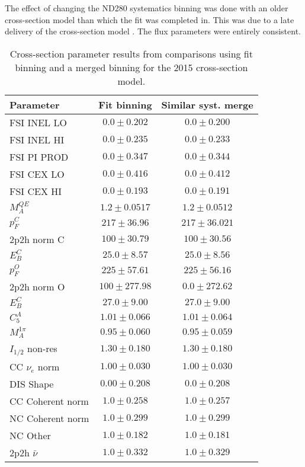 The effect of changing the ND280 systematics binning was done with an older cross-section model than which the fit was completed in. This was due to a late delivery of the cross-section model . The flux parameters were entirely consistent.
\begin{table}
	\centering
	\begin{tabular}{ l c c }
		Parameter & Fit binning & Similar syst. merge \\
		\hline
		FSI INEL LO & $0.0 \pm 0.202$ & $0.0\pm0.200$ \\
		FSI INEL HI & $0.0 \pm 0.235$ & $0.0\pm0.233$ \\
		FSI PI PROD & $0.0 \pm 0.347$ & $0.0\pm0.344$ \\
		FSI CEX LO  & $0.0 \pm 0.416$ & $0.0\pm0.412$ \\
		FSI CEX HI  & $0.0 \pm 0.193$ & $0.0\pm0.191$ \\
		$M_A^{QE}$  & $1.2 \pm 0.0517$ & $1.2\pm0.0512$ \\
		$p_F^{C}$   & $217 \pm 36.96$ & $217\pm36.021$ \\
		2p2h norm C & $100 \pm 30.79$ & $100\pm30.56$ \\
		$E_B^{C}$   & $25.0 \pm 8.57$ & $25.0\pm8.56$ \\
		$p_F^{O}$   & $225 \pm 57.61$  & $225\pm56.16$ \\
		2p2h norm O & $100 \pm 277.98$ & $0.0\pm272.62$ \\
		$E_B^{C}$   & $27.0 \pm 9.00$ & $27.0\pm9.00$ \\
		$C_5^A$		& $1.01 \pm 0.066$ & $1.01\pm0.064$ \\
		$M_A^{1\pi}$ & $0.95 \pm 0.060$ & $0.95\pm0.059$ \\
		$I_{1/2}$ non-res & $1.30 \pm 0.180$ & $1.30\pm0.180$ \\
		CC $\nu_e$ norm & $1.00 \pm 0.030$ & $1.00\pm0.030$ \\
		DIS Shape	& $0.00 \pm 0.208$ & $0.0\pm0.208$ \\
		CC Coherent norm & $1.0 \pm 0.258$ & $1.0\pm0.257$ \\
		NC Coherent norm & $1.0 \pm 0.299$ & $1.0\pm0.299$ \\
		NC Other & $1.0 \pm 0.182$ & $1.0\pm0.181$ \\
		2p2h $\bar{\nu}$ & $1.0 \pm 0.332$ & $1.0\pm0.329$ \\
	\end{tabular}
	\caption{Cross-section parameter results from comparisons using fit binning and a merged binning for the 2015 cross-section model.}
\label{fig:2017_rebin_asimov}
\end{table}


